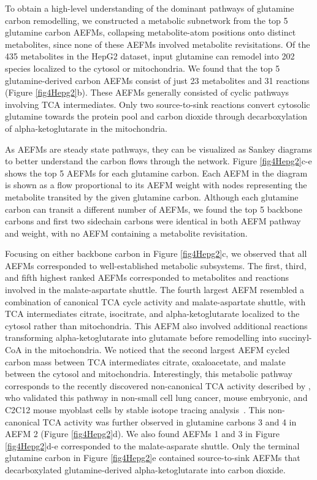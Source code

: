 \documentclass[12pt]{article}
\begin{document}
To obtain a high-level understanding of the dominant pathways of glutamine
carbon remodelling, we constructed a metabolic subnetwork from the top
5 glutamine carbon AEFMs, collapsing metabolite-atom positions onto
distinct metabolites, since none of these AEFMs involved metabolite
revisitations. Of the 435 metabolites in the HepG2 dataset, input
glutamine can remodel into 202 species localized to the cytosol or
mitochondria. We found that the top 5 glutamine-derived carbon AEFMs
consist of just 23 metabolites and 31 reactions (Figure \ref{fig4Hepg2}b).
These AEFMs generally consisted of cyclic pathways involving TCA
intermediates. Only two source-to-sink reactions convert cytosolic
glutamine towards the protein pool and carbon dioxide through
decarboxylation of alpha-ketoglutarate in the mitochondria.

As AEFMs are steady state pathways, they can be visualized as Sankey
diagrams to better understand the carbon flows through the network. Figure
\ref{fig4Hepg2}c-e shows the top 5 AEFMs for each glutamine carbon. Each
AEFM in the diagram is shown as a flow proportional to its AEFM weight
with nodes representing the metabolite transited by the given glutamine
carbon. Although each glutamine carbon can transit a different number of
AEFMs, we found the top 5 backbone carbons and first two sidechain carbons
were identical in both AEFM pathway and weight, with no AEFM containing
a metabolite revisitation.

Focusing on either backbone carbon in Figure \ref{fig4Hepg2}c, we observed
that all AEFMs corresponded to well-established metabolic subsystems. The
first, third, and fifth highest ranked AEFMs corresponded to metabolites
and reactions involved in the malate-aspartate shuttle. The fourth largest
AEFM resembled a combination of canonical TCA cycle activity and
malate-aspartate shuttle, with TCA intermediates citrate, isocitrate, and
alpha-ketoglutarate localized to the cytosol rather than mitochondria.
This AEFM also involved additional reactions transforming
alpha-ketoglutarate into glutamate before remodelling into succinyl-CoA in
the mitochondria. We noticed that the second largest AEFM cycled carbon
mass between TCA intermediates citrate, oxaloacetate, and malate between
the cytosol and mitochondria. Interestingly, this metabolic pathway
corresponds to the recently discovered non-canonical TCA activity
described by \citeauthor{ArnoldPaigeK2022Anta}, who validated this pathway
in non-small cell lung cancer, mouse embryonic, and C2C12 mouse myoblast
cells by stable isotope tracing analysis~\citep{ArnoldPaigeK2022Anta}.
This non-canonical TCA activity was further observed in glutamine carbons
3 and 4 in AEFM 2 (Figure \ref{fig4Hepg2}d). We also found AEFMs 1 and
3 in Figure \ref{fig4Hepg2}d-e corresponded to the malate-asparate
shuttle. Only the terminal glutamine carbon in Figure \ref{fig4Hepg2}e
contained source-to-sink AEFMs that decarboxylated glutamine-derived
alpha-ketoglutarate into carbon dioxide.
\end{document}
